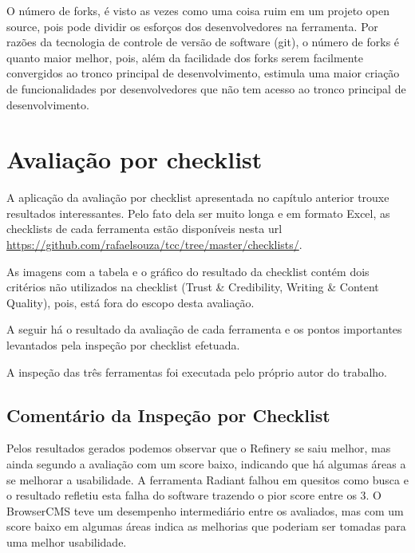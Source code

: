 O número de forks, é visto as vezes como uma coisa ruim em um projeto open source, pois pode dividir os esforços dos desenvolvedores na ferramenta. Por razões da tecnologia de controle de versão de software (git), o número de forks é quanto maior melhor, pois, além da facilidade dos forks serem facilmente convergidos ao tronco principal de desenvolvimento, estimula uma maior criação de funcionalidades por desenvolvedores que não tem acesso ao tronco principal de desenvolvimento.

\section{Avaliação por checklist}

A aplicação da avaliação por checklist apresentada no capítulo anterior trouxe resultados interessantes. Pelo fato dela ser muito longa e em formato Excel, as checklists de cada ferramenta estão disponíveis nesta url \url{https://github.com/rafaelsouza/tcc/tree/master/checklists/}. 

As imagens com a tabela e o gráfico do resultado da checklist contém dois critérios não utilizados na checklist (Trust \& Credibility, Writing \& Content Quality), pois, está fora do escopo desta avaliação.

A seguir há o resultado da avaliação de cada ferramenta e os pontos importantes levantados pela inspeção por checklist efetuada. 

A inspeção das três ferramentas foi executada pelo próprio autor do trabalho.





\subsection{Comentário da Inspeção por Checklist}

Pelos resultados gerados podemos observar que o Refinery se saiu melhor, mas ainda segundo a avaliação com um score baixo, indicando que há algumas áreas a se melhorar a usabilidade. A ferramenta Radiant falhou em quesitos como busca e o resultado refletiu esta falha do software trazendo o pior score entre os 3. O BrowserCMS teve um desempenho intermediário entre os avaliados, mas com um score baixo em algumas áreas indica as melhorias que poderiam ser tomadas para uma melhor usabilidade.   
